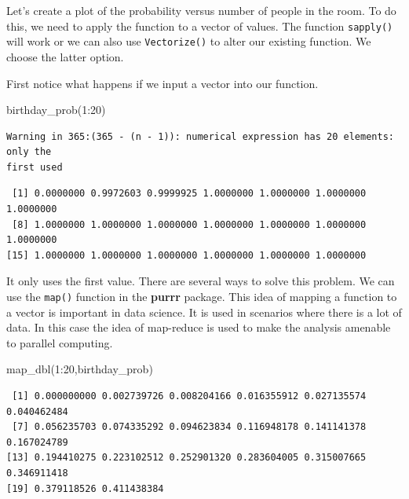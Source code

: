 \documentclass[
  letterpaper,
  DIV=11,
  numbers=noendperiod]{scrreprt}
\newenvironment{Shaded}{\begin{snugshade}}{\end{snugshade}}
\newcommand{\DecValTok}[1]{\textcolor[rgb]{0.68,0.00,0.00}{#1}}
\newcommand{\FunctionTok}[1]{\textcolor[rgb]{0.28,0.35,0.67}{#1}}
\newcommand{\NormalTok}[1]{\textcolor[rgb]{0.00,0.23,0.31}{#1}}
\newcommand{\SpecialCharTok}[1]{\textcolor[rgb]{0.37,0.37,0.37}{#1}}
\begin{document}
Let's create a plot of the probability versus number of people in the
room. To do this, we need to apply the function to a vector of values.
The function \texttt{sapply()} will work or we can also use
\texttt{Vectorize()} to alter our existing function. We choose the
latter option.

First notice what happens if we input a vector into our function.

\begin{Shaded}
\begin{Highlighting}[]
\FunctionTok{birthday\_prob}\NormalTok{(}\DecValTok{1}\SpecialCharTok{:}\DecValTok{20}\NormalTok{)}
\end{Highlighting}
\end{Shaded}

\begin{verbatim}
Warning in 365:(365 - (n - 1)): numerical expression has 20 elements: only the
first used
\end{verbatim}

\begin{verbatim}
 [1] 0.0000000 0.9972603 0.9999925 1.0000000 1.0000000 1.0000000 1.0000000
 [8] 1.0000000 1.0000000 1.0000000 1.0000000 1.0000000 1.0000000 1.0000000
[15] 1.0000000 1.0000000 1.0000000 1.0000000 1.0000000 1.0000000
\end{verbatim}

It only uses the first value. There are several ways to solve this
problem. We can use the \texttt{map()} function in the \textbf{purrr}
package. This idea of mapping a function to a vector is important in
data science. It is used in scenarios where there is a lot of data. In
this case the idea of map-reduce is used to make the analysis amenable
to parallel computing.

\begin{Shaded}
\begin{Highlighting}[]
\FunctionTok{map\_dbl}\NormalTok{(}\DecValTok{1}\SpecialCharTok{:}\DecValTok{20}\NormalTok{,birthday\_prob)}
\end{Highlighting}
\end{Shaded}

\begin{verbatim}
 [1] 0.000000000 0.002739726 0.008204166 0.016355912 0.027135574 0.040462484
 [7] 0.056235703 0.074335292 0.094623834 0.116948178 0.141141378 0.167024789
[13] 0.194410275 0.223102512 0.252901320 0.283604005 0.315007665 0.346911418
[19] 0.379118526 0.411438384
\end{verbatim}
\end{document}
